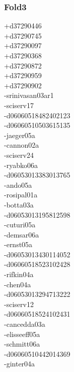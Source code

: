 \begin{multicols}{4}
\subsubsection*{Fold3}
+d37290446\\
+d37290745\\
+d37290097\\
+d37290368\\
+d37290872\\
+d37290959\\
+d37290902\\
-srinivasan03ar1\\
-sciserv17\\
-d06060518482402123\\
-d06060510503615135\\
-jaeger05a\\
-cannon02a\\
-sciserv24\\
-ryabko06a\\
-d06053013383013765\\
-ando05a\\
-rosipal01a\\
-botta03a\\
-d06053013195812598\\
-cuturi05a\\
-demsar06a\\
-ernst05a\\
-d06053013430114052\\
-d06060518523102428\\
-rifkin04a\\
-chen04a\\
-d06053013294713222\\
-sciserv12\\
-d06060518524102431\\
-cancedda03a\\
-elisseeff05a\\
-schmitt06a\\
-d06060510442014369\\
-ginter04a\\

\end{multicols}
